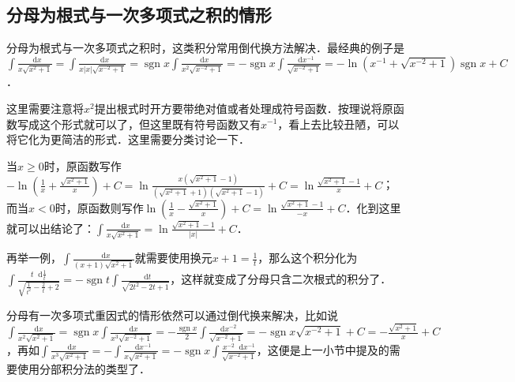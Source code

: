 \documentclass{ctexbook}
\DeclareMathOperator{\sgn}{sgn}
\newcommand*{\dif}{\mathop{}\!\mathrm{d}}
\begin{document}
\subsection{分母为根式与一次多项式之积的情形}
分母为根式与一次多项式之积时，这类积分常用倒代换方法解决．最经典的例子是$\int\frac{\dif{x}}{x\sqrt{x^{2}+1}}=\int\frac{\dif{x}}{x\left|x\right|\sqrt{x^{-2}+1}}=\sgn{x}\int\frac{\dif{x}}{x^{2}\sqrt{x^{-2}+1}}=-\sgn{x}\int\frac{\dif{x^{-1}}}{\sqrt{x^{-2}+1}}=-\ln{\left(x^{-1}+\sqrt{x^{-2}+1}\right)}\sgn{x}+C$．\par
这里需要注意将$x^{2}$提出根式时开方要带绝对值或者处理成符号函数．按理说将原函数写成这个形式就可以了，但这里既有符号函数又有$x^{-1}$，看上去比较丑陋，可以将它化为更简洁的形式．这里需要分类讨论一下．\par
当$x\ge0$时，原函数写作$-\ln{\left(\frac{1}{x}+\frac{\sqrt{x^{2}+1}}{x}\right)}+C=\ln{\frac{x\left(\sqrt{x^{2}+1}-1\right)}{\left(\sqrt{x^{2}+1}+1\right)\left(\sqrt{x^{2}+1}-1\right)}}+C=\ln{\frac{\sqrt{x^{2}+1}-1}{x}}+C$；而当$x<0$时，原函数则写作$\ln{\left(\frac{1}{x}-\frac{\sqrt{x^{2}+1}}{x}\right)}+C=\ln{\frac{\sqrt{x^{2}+1}-1}{-x}}+C$．化到这里就可以出结论了：$\int\frac{\dif{x}}{x\sqrt{x^{2}+1}}=\ln{\frac{\sqrt{x^{2}+1}-1}{\left|x\right|}}+C$．\par
再举一例，$\int\frac{\dif{x}}{\left(x+1\right)\sqrt{x^{2}+1}}$就需要使用换元$x+1=\frac{1}{t}$，那么这个积分化为$\int\frac{t\dif{\frac{1}{t}}}{\sqrt{\frac{1}{t^{2}}-\frac{2}{t}+2}}=-\sgn{t}\int\frac{\dif{t}}{\sqrt{2t^{2}-2t+1}}$，这样就变成了分母只含二次根式的积分了．\par
分母有一次多项式重因式的情形依然可以通过倒代换来解决，比如说$\int\frac{\dif{x}}{x^{2}\sqrt{x^{2}+1}}=\sgn{x}\int\frac{\dif{x}}{x^{3}\sqrt{x^{-2}+1}}=-\frac{\sgn{x}}{2}\int\frac{\dif{x^{-2}}}{\sqrt{x^{-2}+1}}=-\sgn{x}\sqrt{x^{-2}+1}+C=-\frac{\sqrt{x^{2}+1}}{x}+C$，再如$\int\frac{\dif{x}}{x^{3}\sqrt{x^{2}+1}}=-\int\frac{\dif{x^{-1}}}{x\sqrt{x^{2}+1}}=-\sgn{x}\int\frac{x^{-2}\dif{x^{-1}}}{\sqrt{x^{-2}+1}}$，这便是上一小节中提及的需要使用分部积分法的类型了．\par
\end{document}
